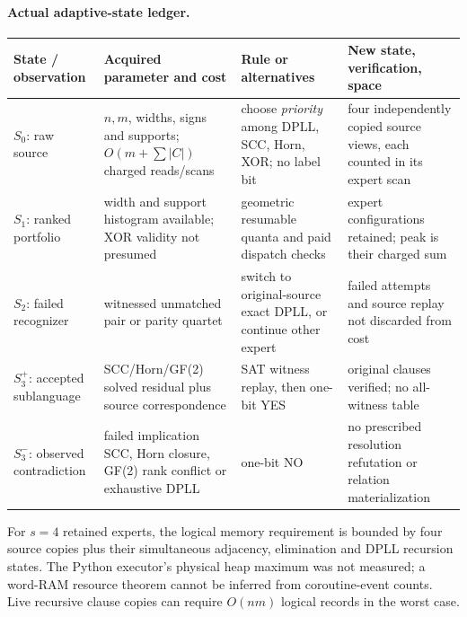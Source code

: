 \documentclass[11pt]{article}
\begin{document}
\paragraph{Actual adaptive-state ledger.}
\begin{center}\small
\begin{tabular}{p{.17\linewidth}p{.23\linewidth}p{.26\linewidth}p{.25\linewidth}}
\toprule
State / observation & Acquired parameter and cost & Rule or alternatives & New state, verification, space \\
\midrule
$S_0$: raw source & $n,m$, widths, signs and supports; $O(m+\sum|C|)$ charged reads/scans & choose \emph{priority} among DPLL, SCC, Horn, XOR; no label bit & four independently copied source views, each counted in its expert scan\\
$S_1$: ranked portfolio & width and support histogram available; XOR validity not presumed & geometric resumable quanta and paid dispatch checks & expert configurations retained; peak is their charged sum\\
$S_2$: failed recognizer & witnessed unmatched pair or parity quartet & switch to original-source exact DPLL, or continue other expert & failed attempts and source replay not discarded from cost\\
$S_3^+$: accepted sublanguage & SCC/Horn/GF(2) solved residual plus source correspondence & SAT witness replay, then one-bit YES & original clauses verified; no all-witness table\\
$S_3^-$: observed contradiction & failed implication SCC, Horn closure, GF(2) rank conflict or exhaustive DPLL & one-bit NO & no prescribed resolution refutation or relation materialization\\
\bottomrule
\end{tabular}
\end{center}
For $s=4$ retained experts, the logical memory requirement is bounded by four source copies plus their simultaneous adjacency, elimination and DPLL recursion states. The Python executor's physical heap maximum was not measured; a word-RAM resource theorem cannot be inferred from coroutine-event counts. Live recursive clause copies can require $O(nm)$ logical records in the worst case.
\end{document}
